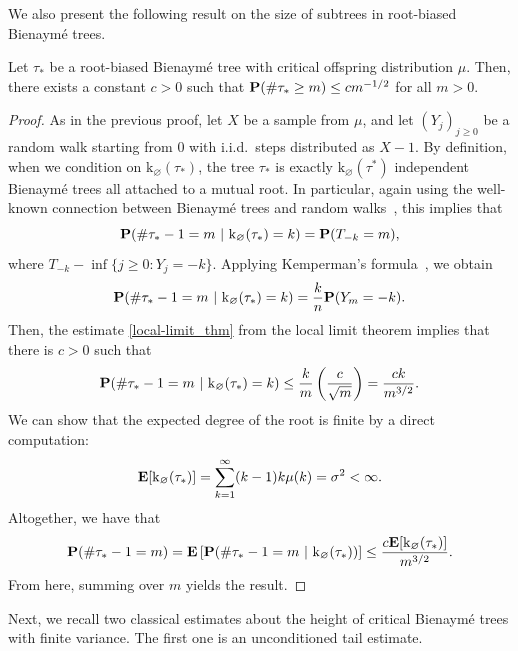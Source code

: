 \documentclass[11pt,reqno]{amsart}
\newcommand{\rk}{\mathrm{k}}
\renewcommand{\emptyset}{\varnothing}
\begin{document}
We also present the following result on the size of subtrees in root-biased Bienaym\'{e} trees.

\begin{lem}\label{lem:size-biased_tail}
    Let $\tau_*$ be a root-biased Bienaymé tree with critical offspring distribution $\mu$. Then, there exists a constant $c > 0$ such that $\mathbf{P}(\#\tau_* \geq m) \leq cm^{-1/2}$ for all $m>0$.
\end{lem}

\begin{proof}
    As in the previous proof, let $X$ be a sample from $\mu$, and let $(Y_j)_{j\ge 0}$ be a random walk starting from $0$ with i.i.d.~steps distributed as $X-1$.
    By definition, when we condition on $\rk_\emptyset(\tau_*)$, the tree $\tau_*$ is exactly $\rk_\emptyset(\tau^*)$ independent Bienaym\'{e} trees all attached to a mutual root. In particular, again using the well-known connection between Bienaym\'{e} trees and random walks~\cite[Corollary 1.6]{legall2005random}, this implies that
    $$
    \prob(\# \tau_*-1 = m  \ | \  \rk_\emptyset(\tau_*) = k) = \prob( T_{-k} = m),
    $$
    where $T_{-k} - \inf\{ j \geq 0 : Y_j = -k \}$. Applying Kemperman's formula~\cite{van2008elementary}, we obtain
    \begin{equation}
    \label{kemperman_formula}
    \prob(\# \tau_*-1 = m  \ | \  \rk_\emptyset(\tau_*) = k) = \frac{k}{n}\prob(Y_m = -k).
    \end{equation}
    Then, the estimate \eqref{local-limit_thm} from the local limit theorem implies that there is $c > 0$ such that
    $$
    \prob(\# \tau_*-1 = m  \ | \  \rk_\emptyset(\tau_*) = k) \leq \frac{k}{m}\left(\frac{c}{\sqrt{m}}\right) = \frac{ck}{m^{3/2}}.
    $$
    We can show that the expected degree of the root is finite by a direct computation:
    \begin{equation}
    \label{first-moment_root-biased}
    \ex[\rk_\emptyset(\tau_*)] = \sum_{k = 1}^\infty (k-1)k\mu(k) = \sigma^2 < \infty.
    \end{equation}
    Altogether, we have that
    $$
    \prob(\# \tau_* - 1 = m) = \ex\left[ \prob(\# \tau_*-1 = m  \ | \  \rk_\emptyset(\tau_*)) \right] \leq \frac{c\ex[\rk_\emptyset(\tau_*)]}{m^{3/2}}.
    $$
    From here, summing over $m$ yields the result.
\end{proof}

Next, we recall two classical estimates about the height of critical Bienaymé trees with finite variance. The first one is an unconditioned tail estimate.
\end{document}

